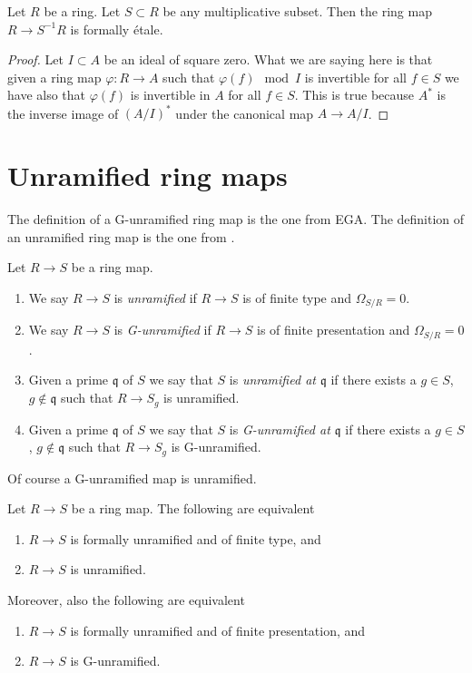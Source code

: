 \begin{lemma}
\label{lemma-localization-formally-etale}
Let $R$ be a ring. Let $S \subset R$ be any multiplicative subset.
Then the ring map $R \to S^{-1}R$ is formally \'etale.
\end{lemma}

\begin{proof}
Let $I \subset A$ be an ideal of square zero. What we are saying
here is that given a ring map $\varphi : R \to A$ such that
$\varphi(f) \mod I$ is invertible for all $f \in S$ we have also that
$\varphi(f)$ is invertible in $A$ for all $f \in S$. This is true because
$A^*$ is the inverse image of $(A/I)^*$ under the canonical map
$A \to A/I$.
\end{proof}





\section{Unramified ring maps}
\label{section-unramified}

\noindent
The definition of a G-unramified ring map is the one from EGA.
The definition of an unramified ring map is the one from \cite{Henselian}.

\begin{definition}
\label{definition-unramified}
Let $R \to S$ be a ring map.
\begin{enumerate}
\item We say $R \to S$ is {\it unramified} if $R \to S$ is of
finite type and $\Omega_{S/R} = 0$.
\item We say $R \to S$ is {\it G-unramified} if $R \to S$ is of finite
presentation and $\Omega_{S/R} = 0$.
\item Given a prime $\mathfrak q$ of $S$ we say that $S$ is
{\it unramified at $\mathfrak q$} if there exists a
$g \in S$, $g \not \in \mathfrak q$ such that $R \to S_g$ is unramified.
\item Given a prime $\mathfrak q$ of $S$ we say that $S$ is
{\it G-unramified at $\mathfrak q$} if there exists a
$g \in S$, $g \not \in \mathfrak q$ such that $R \to S_g$ is G-unramified.
\end{enumerate}
\end{definition}

\noindent
Of course a G-unramified map is unramified.

\begin{lemma}
\label{lemma-formally-unramified-unramified}
Let $R \to S$ be a ring map. The following are equivalent
\begin{enumerate}
\item $R \to S$ is formally unramified and of finite type, and
\item $R \to S$ is unramified.
\end{enumerate}
Moreover, also the following are equivalent
\begin{enumerate}
\item $R \to S$ is formally unramified and of finite presentation, and
\item $R \to S$ is G-unramified.
\end{enumerate}
\end{lemma}

